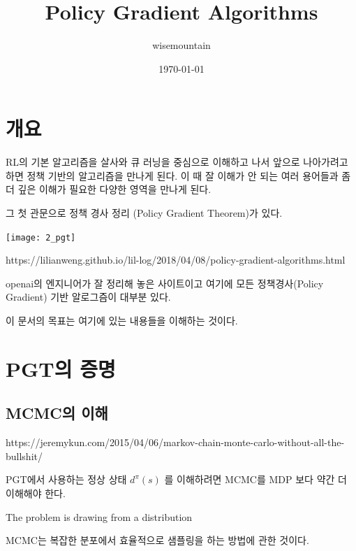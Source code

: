 \documentclass[ %
    a4paper,    %
    amsmath,    %
    itemph,     %
]{oblivoir}     %
\theoremstyle{theorem}
\theoremstyle{theorem}
\theoremstyle{theorem}
\theoremstyle{definition}
\theoremstyle{remark}
\begin{document}
\title{Policy Gradient Algorithms}
\author{wisemountain}
\date{\today}

\maketitle

\newpage

\tableofcontents

\newpage

\section{개요}

RL의 기본 알고리즘을 살사와 큐 러닝을 중심으로 이해하고 나서 앞으로 나아가려고 하면 
정책 기반의 알고리즘을 만나게 된다. 이 때 잘 이해가 안 되는 여러 용어들과 
좀 더 깊은 이해가 필요한 다양한 영역을 만나게 된다. 

그 첫 관문으로 정책 경사 정리 (Policy Gradient Theorem)가 있다. 

\begin{center}
\texttt{[image: 2\_pgt]}
\end{center}

https://lilianweng.github.io/lil-log/2018/04/08/policy-gradient-algorithms.html

openai의 엔지니어가 잘 정리해 놓은 사이트이고 여기에 모든 정책경사(Policy Gradient) 기반 
알로그즘이 대부분 있다. 

이 문서의 목표는 여기에 있는 내용들을 이해하는 것이다. 

\section{PGT의 증명}

\subsection{MCMC의 이해}

https://jeremykun.com/2015/04/06/markov-chain-monte-carlo-without-all-the-bullshit/

PGT에서 사용하는 정상 상태 $d^\pi(s)$ 를 이해하려면 MCMC를 MDP 보다 약간 더 이해해야 한다. 

\begin{tcolorbox}
The problem is drawing from a distribution
\end{tcolorbox}

MCMC는 복잡한 분포에서 효율적으로 샘플링을 하는 방법에 관한 것이다. 
\end{document}
